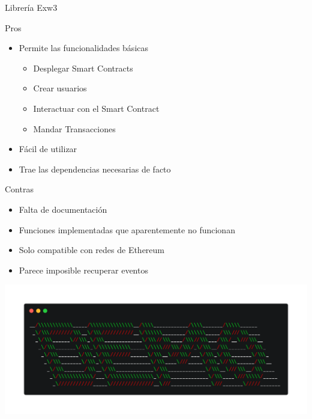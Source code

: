 \documentclass{beamer}
\begin{document}
\begin{frame}{Librería Exw3}
	\begin{exampleblock}{\small Pros}
    \begin{itemize}
      \item {\small Permite las funcionalidades básicas}
        \begin{itemize}
          \item {\small Desplegar Smart Contracts}
          \item {\small Crear usuarios}
          \item {\small Interactuar con el Smart Contract}
          \item {\small Mandar Transacciones}
        \end{itemize}
      \item {\small Fácil de utilizar}
      \item {\small Trae las dependencias necesarias de facto}
    \end{itemize}
	\end{exampleblock}
	\begin{alertblock}{\small Contras}
    \begin{itemize}
      \item {\small Falta de documentación}
      \item {\small Funciones implementadas que aparentemente no funcionan}
      \item {\small Solo compatible con redes de Ethereum}
      \item {\small Parece imposible recuperar eventos}
    \end{itemize}
	\end{alertblock}
\end{frame}

\begin{frame}
  \begin{center}
  \includegraphics[scale=0.15]{Images/demo.png}
  \end{center}
\end{frame}
\end{document}
